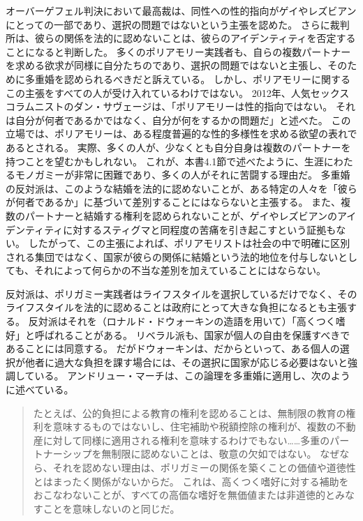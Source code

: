\documentclass[paper=a4,book,openany]{jlreq} \usepackage{mystyle}
\begin{document}
オーバーゲフェル判決において最高裁は、同性への性的指向がゲイやレズビアンにとっての一部であり、選択の問題ではないという主張を認めた。
さらに裁判所は、彼らの関係を法的に認めないことは、彼らのアイデンティティを否定することになると判断した。
多くのポリアモリー実践者も、自らの複数パートナーを求める欲求が同様に自分たちのであり、選択の問題ではないと主張し、そのために多重婚を認められるべきだと訴えている。
しかし、ポリアモリーに関するこの主張をすべての人が受け入れているわけではない。
2012年、人気セックスコラムニストのダン・サヴェージは、「ポリアモリーは性的指向ではない。
それは自分が何者であるかではなく、自分が何をするかの問題だ」と述べた\citep{savage12:_savag_busted}。
この立場では、ポリアモリーは、ある程度普遍的な性的多様性を求める欲望の表れであるとされる。
実際、多くの人が、少なくとも自分自身は複数のパートナーを持つことを望むかもしれない。
これが、本書4.1節で述べたように、生涯にわたるモノガミーが非常に困難であり、多くの人がそれに苦闘する理由だ。
多重婚の反対派は、このような結婚を法的に認めないことが、ある特定の人々を「彼らが何者であるか」に基づいて差別することにはならないと主張する。
また、複数のパートナーと結婚する権利を認められないことが、ゲイやレズビアンのアイデンティティに対するスティグマと同程度の苦痛を引き起こすという証拠もない。
したがって、この主張によれば、ポリアモリストは社会の中で明確に区別される集団ではなく、国家が彼らの関係に結婚という法的地位を付与しないとしても、それによって何らかの不当な差別を加えていることにはならない。

反対派は、ポリガミー実践者はライフスタイルを選択しているだけでなく、そのライフスタイルを法的に認めることは政府にとって大きな負担になるとも主張する。
反対派はそれを（ロナルド・ドウォーキンの造語を用いて）「高くつく嗜好」と呼ばれることがある。
リベラル派も、国家が個人の自由を保護すべきであることには同意する。
だがドウォーキンは、だからといって、ある個人の選択が他者に過大な負担を課す場合には、その選択に国家が応じる必要はないと強調している\citep[p.229]{dworkin81:_what_is_equal}。
アンドリュー・マーチは、この論理を多重婚に適用し、次のように述べている。

\begin{quote}
たとえば、公的負担による教育の権利を認めることは、無制限の教育の権利を意味するものではないし、住宅補助や税額控除の権利が、複数の不動産に対して同様に適用される権利を意味するわけでもない……多重のパートナーシップを無制限に認めないことは、敬意の欠如ではない。
なぜなら、それを認めない理由は、ポリガミーの関係を築くことの価値や道徳性とはまったく関係がないからだ。
これは、高くつく嗜好に対する補助をおこなわないことが、すべての高価な嗜好を無価値または非道徳的とみなすことを意味しないのと同じだ。
\citep[p.249]{march11:_is_there_right_polyg}
\end{quote}
\end{document}
